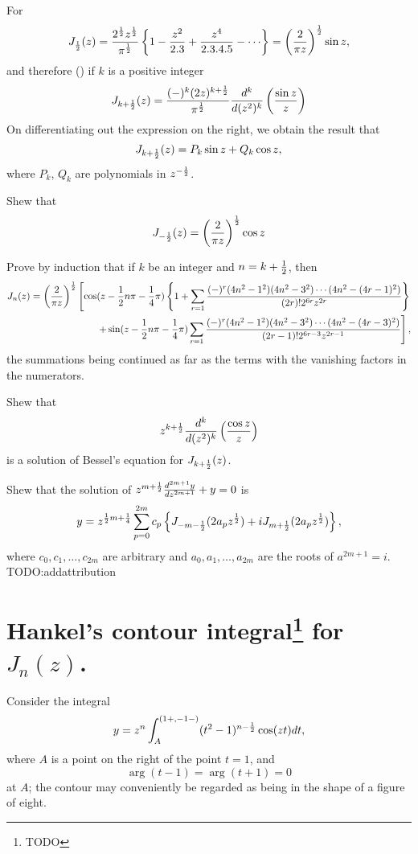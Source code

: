\documentclass{book}
\begin{document}
For 
$$
J_{\half}(z) 
= 
\frac{2^{\half} z^{\half}}{\pi^{\half}}
\thebrace{ 1
  - \frac{z^2}{2.3}
  + \frac{z^4}{2.3.4.5}
  - \cdots
}
= \theparen{ \frac{2}{\pi z}  }^{\half}
\sin z,
$$
and therefore () if $k$ is a
positive integer
$$
J_{k+\frac{1}{2}}(z)
=
\frac{(-)^k (2z)^{k+\frac{1}{2}}}{\pi^{\frac{1}{2}}}
\frac{d^k}{d (z^2)^k}
\left(  \frac{\sin z}{z}   \right)
$$
On differentiating out the expression on the right, we obtain the
result that
$$
J_{k+\frac{1}{2}}(z) = P_k \sin z + Q_k \cos z,
$$
where $P_k$, $Q_k$ are polynomials in $z^{-\frac{1}{2}}$.
\begin{wandwexample}
  Shew that
  $$
  J_{-\frac{1}{2}}(z) = \left(  \frac{2}{\pi z} \right)^{\frac{1}{2}} \cos z
  $$
\end{wandwexample}
%
%
\begin{wandwexample}
  Prove by induction that if $k$ be an integer and $n = k + \frac{1}{2}$,
  then
  \begin{align*}
    J_n(z)
    =
    \left( \frac{2}{\pi z} \right)^{\frac{1}{2}}
    \left[
      \cos(z - \frac{1}{2} n \pi - \frac{1}{4}\pi)
      \left\{ 
        1
        +
        \sum_{r=1}
        \frac{(-)^r (4n^2-1^2)(4n^2-3^2)\cdots(4n^2-(4r-1)^2)}{(2r)! 2^{6r} z^{2r}}
         \right\}
      \right.
      \\
      \left.
      +
      \sin(z - \frac{1}{2} n \pi - \frac{1}{4}\pi)
      \sum_{r=1}
      \frac{(-)^r (4n^2-1^2)(4n^2-3^2)\cdots(4n^2-(4r-3)^2)}{(2r-1)!
        2^{6r-3} z^{2r-1}}
      \right],
    \end{align*}
    the summations being continued as far as the terms with the
    vanishing factors in the numerators.
\end{wandwexample}
\begin{wandwexample}
  Shew that
  $$
  z^{k+\frac{1}{2}} \frac{d^k}{d (z^2)^k} \left( \frac{\cos z}{z} \right)
  $$
  is a solution of Bessel's equation for $J_{k+\frac{1}{2}}(z)$.
\end{wandwexample}
\begin{wandwexample}
  Shew that the solution of
  $
  z^{m+\frac{1}{2}} \frac{d^{2m+1} y}{dz^{2m+1}} + y = 0
  $
  is
  $$
  y
  =
  z^{\frac{1}{2} m + \frac{1}{4}}
  \sum_{p=0}^{2m}
  c_p
  \left\{  J_{-m-\frac{1}{2}}(2a_pz^{\frac{1}{2}}) + iJ_{m+\frac{1}{2}}(2a_pz^{\frac{1}{2}}) \right\},
  $$
  where
  $c_0,c_1,\ldots,c_{2m}$ are arbitrary and
  $a_0,a_1,\ldots,a_{2m}$ are the roots of
  $a^{2m+1}=i$. TODO:addattribution
\end{wandwexample}
\section[Hankel's contour integral for $J_n(z)$.]{Hankel's contour integral\footnote{TODO} for $J_n(z)$.}
Consider the integral
$$
y = z^n \int_A^{(1+,-1-)} (t^2-1)^{n-\frac{1}{2}} \cos(zt) d t,
$$
where $A$ is a point on the right of the point $t=1$, and
$$
\arg(t-1) = \arg(t+1) = 0
$$
at $A$; the contour may conveniently be regarded as being in the shape
of a figure of eight.
\end{document}
